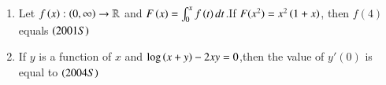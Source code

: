 \documentclass[journal,12pt,onecolumn]{IEEEtran}
\theoremstyle{remark}
\begin{document}
\begin{enumerate}
\begin{enumerate}
\end{enumerate}
\item Let $f\left(x\right):\left(0,\infty\right)\rightarrow \mathbb{R}$ and $F\left(x\right)=\int_{0}^x f\left(t\right)dt$.If $F(x^2)=x^2\left(1+x\right)$, then $f(4)$ equals $\hfill\brak{2001S}$
\begin{enumerate}
\end{enumerate}
\item If $y$ is a function of $x$ and $\log{\ensuremath{\left(x+y\right)}}-2xy=0$,then the value of $y'(0)$ is equal to $\hfill\brak{2004S}$
\begin{enumerate}

\end{enumerate}
\end{enumerate}
\end{document}
